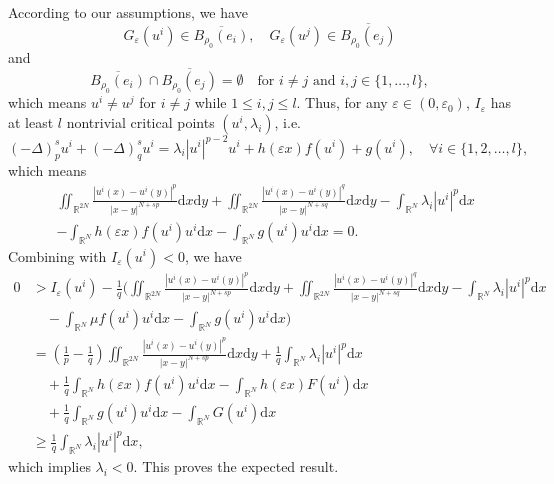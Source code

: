 \documentclass[10pt,a4paper]{amsart}
\numberwithin{equation}{section}
\begin{document}
According to our assumptions, we have
$$
G_\varepsilon(u^{i})\in\overline{B_{\rho_{0}}(e_i)},\quad 
G_\varepsilon(u^{j})\in\overline{B_{\rho_{0}}(e_j)}
$$
and
$$
\overline{B_{\rho_{0}}(e_i)}\cap\overline{B_{\rho_{0}}(e_j)}=\emptyset \quad 
\text{for }  i\neq j  \text{ and }i,j\in{\{1,\dots,l\}},
$$
which means $u^{i}\neq u^{j}$ for $i \neq  j$ while $1 \le i, j \le l$.
Thus, for any $\varepsilon\in(0,\varepsilon_0)$, $I_\varepsilon$ has at least 
$l$ nontrivial critical points $(u^{i},\lambda_i)$, i.e.
$$
(-\Delta)_p^{s} u^{i}+(-\Delta)_q^{s} u^{i}=\lambda_i |u^{i}|^{p-2}u^{i}
+h(\varepsilon x)f(u^{i})+g(u^{i}),\quad \forall i\in\{1,2,\dots,l\},
$$
which means
\begin{align*}
&\iint_{\mathbb{R}^{2N}}\frac{|u^{i}(x)-u^{i}(y)|^{p}}{|x-y|^{N+sp}}\mathrm{d}x\mathrm{d}y+\iint_{\mathbb{R}^{2N}}\frac{|u^{i}(x)-u^{i}(y)|^{q}}{|x-y|^{N+sq}}\mathrm{d}x\mathrm{d}y-\int_{\mathbb{R}^N}\lambda_{i} |u^{i}|^{p}\mathrm{d}x\\
&-\int_{\mathbb{R}^N}h(\varepsilon x) f(u^{i})u^{i}\mathrm{d}x-\int_{\mathbb{R}^N} g(u^{i})u^{i}\mathrm{d}x=0.
\end{align*}
Combining with $I_\varepsilon(u^{i})<0$, we have
\begin{align*}
0&>I_\varepsilon(u^{i})-\frac{1}{q}(\iint_{\mathbb{R}^{2N}}\frac{|u^{i}(x)
 -u^{i}(y)|^{p}}{|x-y|^{N+sp}}\mathrm{d}x\mathrm{d}y
 +\iint_{\mathbb{R}^{2N}}\frac{|u^{i}(x)-u^{i}(y)|^{q}}{|x-y|^{N+sq}}
 \mathrm{d}x\mathrm{d}y-\int_{\mathbb{R}^N}\lambda_{i} |u^{i}|^{p}\mathrm{d}x\\
&\quad -\int_{\mathbb{R}^N}\mu f(u^{i})u^{i}\mathrm{d}x
 -\int_{\mathbb{R}^N} g(u^{i})u^{i}\mathrm{d}x)\\
&= (\frac{1}{p}-\frac{1}{q})\iint_{\mathbb{R}^{2N}}\frac{|u^{i}(x)-u^{i}(y)|^{p}}
 {|x-y|^{N+sp}}\mathrm{d}x\mathrm{d}y
 +\frac{1}{q}\int_{\mathbb{R}^N}\lambda_i |{u^{i}}|^{p}\mathrm{d}x\\
&\quad +\frac{1}{q}\int_{\mathbb{R}^N}h(\varepsilon x)
 f(u^{i})u^{i}\mathrm{d}x-\int_{\mathbb{R}^N}h(\varepsilon x)  F(u^{i})\mathrm{d}x\\
&\quad +\frac{1}{q}\int_{\mathbb{R}^N} g(u^{i})u^{i}\mathrm{d}x
 -\int_{\mathbb{R}^N} G(u^{i})\mathrm{d}x\\
&\geq \frac{1}{q}\int_{\mathbb{R}^N}\lambda_i |{u^{i}}|^{p}\mathrm{d}x,
\end{align*}
which implies $\lambda_i<0$. This proves the expected result.
\end{document}
